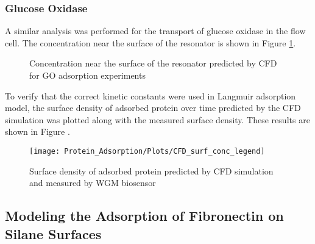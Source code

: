 \subsubsection{Glucose Oxidase}

A similar analysis was performed for the transport of glucose oxidase
in the flow cell. The concentration near the surface of the resonator
is shown in Figure \ref{fig:CFD GO near surf conc}.%
\begin{figure}


\caption{\label{fig:CFD GO near surf conc}Concentration near the surface of
the resonator predicted by CFD for GO adsorption experiments}
%
\end{figure}
 To verify that the correct kinetic constants were used in Langmuir
adsorption model, the surface density of adsorbed protein over time
predicted by the CFD simulation was plotted along with the measured
surface density. These results are shown in Figure .%
\begin{figure}

\texttt{[image: Protein\_Adsorption/Plots/CFD\_surf\_conc\_legend]}\caption{\label{fig:CFD GO surface density}Surface density of adsorbed protein
predicted by CFD simulation and measured by WGM biosensor}
%
\end{figure}



\subsection{Modeling the Adsorption of Fibronectin on Silane Surfaces}

